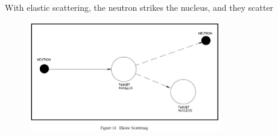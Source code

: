 \documentclass[aspectratio=1610,pdftex,dvipsnames,compress,xcolor={dvipsnames}]{beamer}
\begin{document}
\begin{frame}{With elastic scattering, the neutron strikes the nucleus, and they scatter}
    \begin{figure}
        \centering
        \includegraphics[width=0.75\textwidth]{neutron.elastic.scattering.jpg}
    \end{figure}
\end{frame}
\end{document}
